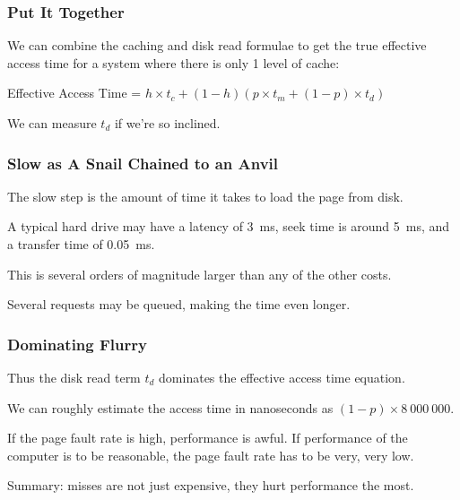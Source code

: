 \begin{frame}
\frametitle{Put It Together}

We can combine the caching and disk read formulae to get the true effective access time for a system where there is only 1 level of cache:

\begin{center}
	Effective Access Time = $ h \times t_{c} + (1 - h) ( p \times t_{m} + (1 - p) \times t_{d})$
\end{center}

We can measure $t_{d}$ if we're so inclined.

\end{frame}



\begin{frame}
\frametitle{Slow as A Snail Chained to an Anvil}

The slow step is the amount of time it takes to load the page from disk. 

A typical hard drive may have a latency of 3~ms, seek time is around 5~ms, and a transfer time of 0.05~ms. 

This is  several orders of magnitude larger than any of the other costs.

Several requests may be queued, making the time even longer.

\end{frame}



\begin{frame}
\frametitle{Dominating Flurry}


Thus the disk read term $t_{d}$ dominates the effective access time equation. 

We can roughly estimate the access time in nanoseconds as $(1-p) \times 8~000~000$. 

If the page fault rate is high, performance is awful. If performance of the computer is to be reasonable, the page fault rate has to be very, very low. 


Summary: misses are not just expensive, they hurt performance the most.

\end{frame}




